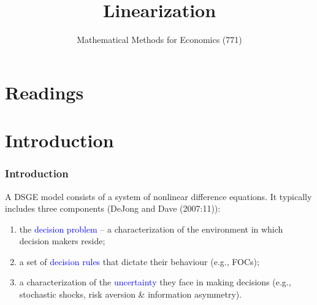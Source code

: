 \documentclass[10pt, handout]{beamer}
\title[Linearization]{Linearization}
\subtitle{Mathematical Methods for Economics (771)}
\institute[Stellenbosch University]{\large{
Stellenbosch University}}
\date{}
\begin{document}
\frame{\titlepage}



\section{Readings}




\section{Introduction}

\begin{frame}

\frametitle{Introduction} \vskip 0.1in

A DSGE model consists of a system of nonlinear
difference equations. It typically includes three components (DeJong
and Dave (2007:11)):

\begin{enumerate}
\item the \textcolor{blue}{decision problem} -- a characterization of the environment in which decision makers
reside;
\item a set of \textcolor{blue}{decision rules} that dictate their behaviour (e.g., FOCs);
\item a characterization of the \textcolor{blue}{uncertainty} they face in making decisions (e.g., stochastic shocks, risk aversion \& information asymmetry).
\end{enumerate}

\end{frame}
\end{document}
